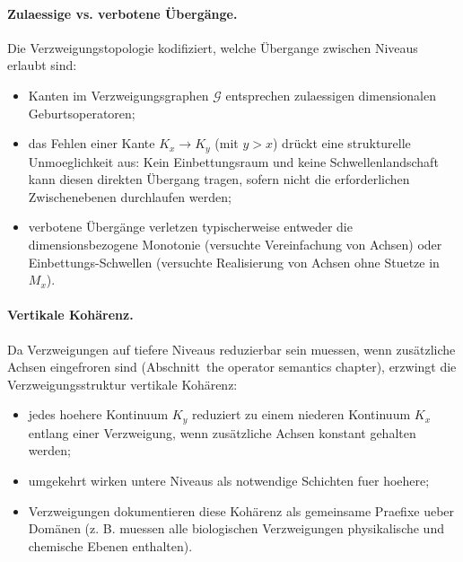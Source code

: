 \paragraph{Zulaessige vs. verbotene Übergänge.}
Die Verzweigungstopologie kodifiziert, welche Übergange zwischen Niveaus
erlaubt sind:
\begin{itemize}
  \item Kanten im Verzweigungsgraphen \(\mathcal{G}\) entsprechen zulaessigen
dimensionalen Geburtsoperatoren;
  \item das Fehlen einer Kante \(K_x \to K_y\) (mit \(y>x\)) drückt eine
        strukturelle Unmoeglichkeit aus: Kein Einbettungsraum und keine
        Schwellenlandschaft kann diesen direkten Übergang tragen, sofern nicht
        die erforderlichen Zwischenebenen durchlaufen werden;
  \item verbotene Übergänge verletzen typischerweise entweder die dimensionsbezogene
        Monotonie (versuchte Vereinfachung von Achsen) oder Einbettungs-Schwellen
        (versuchte Realisierung von Achsen ohne Stuetze in \(M_x\)).
\end{itemize}

\paragraph{Vertikale Kohärenz.}
Da Verzweigungen auf tiefere Niveaus reduzierbar sein muessen, wenn
zusätzliche Achsen eingefroren sind (Abschnitt~the operator semantics chapter), erzwingt
die Verzweigungsstruktur vertikale Kohärenz:
\begin{itemize}
  \item jedes hoehere Kontinuum \(K_y\) reduziert zu einem niederen Kontinuum
        \(K_x\) entlang einer Verzweigung, wenn zusätzliche Achsen konstant
        gehalten werden;
  \item umgekehrt wirken untere Niveaus als notwendige Schichten fuer hoehere;
  \item Verzweigungen dokumentieren diese Kohärenz als gemeinsame Praefixe
        ueber Domänen (z. B. muessen alle biologischen Verzweigungen
        physikalische und chemische Ebenen enthalten).
\end{itemize}

